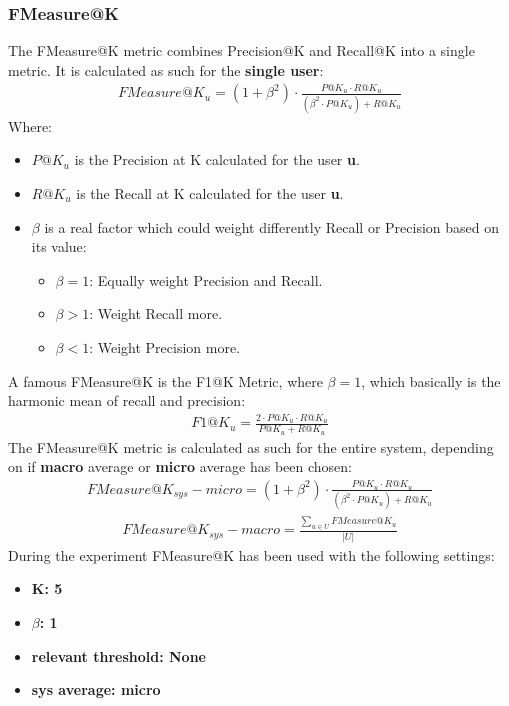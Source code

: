 \documentclass[11pt]{article}
\begin{document}
\subsubsection{FMeasure@K}\label{subsubsec:f-meas-k}
The FMeasure@K metric combines Precision@K and Recall@K into a single metric.
It is calculated as such for the \textbf{single user}:
\hfill\break
\hfill\break
    \[
       \begin{gathered}
           FMeasure@K_u = (1 + \beta^2) \cdot \frac{P@K_u \cdot R@K_u}{(\beta^2 \cdot P@K_u) + R@K_u}
       \end{gathered}
    \]
\hfill\break
\hfill\break
    Where:
\begin{itemize}
    \item $P@K_u$ is the Precision at K calculated for the user \textbf{u}.
    \item $R@K_u$ is the Recall at K calculated for the user \textbf{u}.
    \item $\beta$ is a real factor which could weight differently Recall or Precision based on its value:
    \begin{itemize}
        \item $\beta = 1$: Equally weight Precision and Recall.
        \item $\beta > 1$: Weight Recall more.
        \item $\beta < 1$: Weight Precision more.
    \end{itemize}
\end{itemize}
\hfill\break
\hfill\break
A famous FMeasure@K is the F1@K Metric, where $\beta = 1$, which basically is the harmonic mean of recall and
precision:
\hfill\break
\hfill\break
    \[
      \begin{gathered}
          F1@K_u = \frac{2 \cdot P@K_u \cdot R@K_u}{P@K_u + R@K_u}
      \end{gathered}
    \]
\hfill\break
\hfill\break
The FMeasure@K metric is calculated as such for the entire system, depending on if \textbf{macro} average or
\textbf{micro} average has been chosen:
\hfill\break
\hfill\break
    \[
      \begin{gathered}
          FMeasure@K_{sys} - micro = (1 + \beta^2) \cdot \frac{P@K_u \cdot R@K_u}{(\beta^2 \cdot P@K_u) + R@K_u}
      \end{gathered}
    \]
\hfill\break
\hfill\break
    \[
       \begin{gathered}
           FMeasure@K_{sys} - macro = \frac{\sum_{u \in U} FMeasure@K_u}{|U|}
       \end{gathered}
    \]
\hfill\break
\hfill\break
During the experiment FMeasure@K has been used with the following settings:
\begin{itemize}
    \item \textbf{K: 5}
    \item  \textbf{$\beta$: 1}
    \item \textbf{relevant threshold: None }
    \item \textbf{sys average: micro }
\end{itemize}
\hfill\break
\hfill\break
\end{document}
